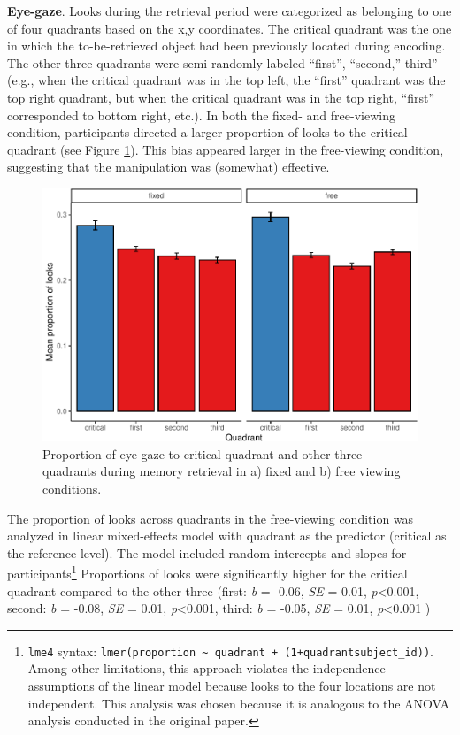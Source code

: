 \documentclass[
  man,floatsintext]{apa6}
\begin{document}
\textbf{Eye-gaze}. Looks during the retrieval period were categorized as belonging to one of four quadrants based on the x,y coordinates. The critical quadrant was the one in which the to-be-retrieved object had been previously located during encoding. The other three quadrants were semi-randomly labeled ``first'', ``second,'' third'' (e.g., when the critical quadrant was in the top left, the ``first'' quadrant was the top right quadrant, but when the critical quadrant was in the top right, ``first'' corresponded to bottom right, etc.). In both the fixed- and free-viewing condition, participants directed a larger proportion of looks to the critical quadrant (see Figure \ref{fig:E2-gaze-fig-both-conds}). This bias appeared larger in the free-viewing condition, suggesting that the manipulation was (somewhat) effective.

\begin{figure}
\centering
\includegraphics{manuscript_files/figure-latex/E2-gaze-fig-both-conds-1.pdf}
\caption{\label{fig:E2-gaze-fig-both-conds}Proportion of eye-gaze to critical quadrant and other three quadrants during memory retrieval in a) fixed and b) free viewing conditions.}
\end{figure}

The proportion of looks across quadrants in the free-viewing condition was analyzed in linear mixed-effects model with quadrant as the predictor (critical as the reference level). The model included random intercepts and slopes for participants\footnote{ \texttt{lme4} syntax: \texttt{lmer(proportion\ \textasciitilde{}\ quadrant\ +\ (1+quadrant\textbar{}subject\_id))}. Among other limitations, this approach violates the independence assumptions of the linear model because looks to the four locations are not independent. This analysis was chosen because it is analogous to the ANOVA analysis conducted in the original paper.} Proportions of looks were significantly higher for the critical quadrant compared to the other three (first: \emph{b} = -0.06, \emph{SE} = 0.01, \emph{p}\textless0.001, second: \emph{b} = -0.08, \emph{SE} = 0.01, \emph{p}\textless0.001, third: \emph{b} = -0.05, \emph{SE} = 0.01, \emph{p}\textless0.001 )
\end{document}
